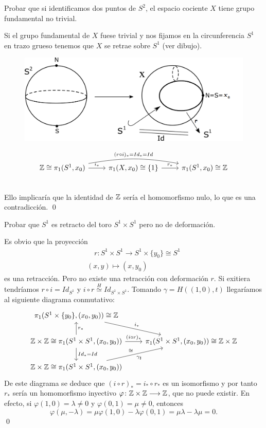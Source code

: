 \documentclass[GTS.tex]{subfiles}
\begin{document}
\begin{ejer}
Probar que si identificamos dos puntos de $S^2$, el espacio cociente $X$ tiene grupo fundamental no trivial.
\end{ejer}
\begin{solucion}Si el grupo fundamental de $X$ fuese trivial y nos fijamos en la circunferencia $S^1$ en trazo grueso tenemos que $X$ se retrae sobre $S^1$ (ver dibujo).
\begin{figure}[h!]
	\includegraphics[scale=0.3]{bitmap}
\end{figure}
\[
\begin{tikzcd}
\Z\cong\pi_1(S^1,x_0)\arrow[r,"i_* "] \arrow[rr,"(r\circ i)_*=Id_*=Id",bend left=10] &  \pi_1(X,x_0)\cong\{1\}\ar[r, "r_* "] & \pi_1(S^1,x_0)\cong\Z\\
\end{tikzcd}
\]
Ello implicaría que la identidad de $\mathbb{Z}$ sería el homomorfismo nulo, lo que es una contradicción. \qed
\end{solucion}

\begin{ejer}
Probar que $S^1$ es retracto del toro $S^1\times S^1$ pero no de deformación.
\end{ejer}
\begin{solucion}
Es obvio que la proyección
\begin{gather*}
\quad r:S^1\times S^1\longrightarrow S^1\times\{y_0\}\cong S^1\\
(x,y)\longmapsto (x,y_0)
\end{gather*}
es una retracción. Pero no existe una retracción con deformación $r$. Si exitiera tendríamos $r\circ i=Id_{S^1}$ y $i\circ r\overset{H}{\simeq}Id_{S^1\times S^1}$. Tomando $\gamma=H((1,0),t)$ llegaríamos al siguiente diagrama conmutativo:
\[
\begin{tikzcd}
\pi_1(S^1\times\{y_0\},(x_0,y_0))\cong\Z\ar[dr, "i_*"]\\
\Z\times\Z\cong\pi_1(S^1\times S^1,(x_0,y_0)) \ar[r, "(i\circ r)_* "]\arrow[u,"r_* "']\ar[d,"Id_*=Id"] & \pi_1(S^1\times S^1,(x_0,y_0))\cong\Z\times\Z\\
\Z\times\Z\cong\pi_1(S^1\times S^1,(x_0,y_0))\arrow[ur,"\gamma_\sharp "',"\cong"]
\end{tikzcd}
\]
De este diagrama se deduce que $(i\circ r)_*=i_*\circ r_*$ es un isomorfismo y por tanto $r_*$ sería un homomorfismo inyectivo $\varphi\colon{\mathbb{Z}\times\mathbb{Z}}\longrightarrow{\mathbb{Z}}$, que no puede existir. En efecto, si $\varphi(1,0)=\lambda\neq 0$ y $\varphi(0,1)=\mu\neq 0$, entonces
\[
\varphi(\mu,-\lambda)=\mu\varphi(1,0)-\lambda\varphi(0,1)=\mu\lambda-\lambda\mu=0. 
\]
\qed
\end{solucion}
\end{document}
